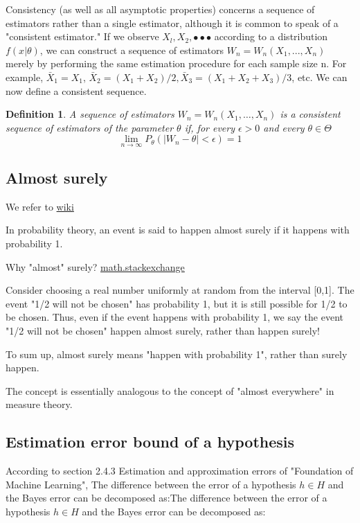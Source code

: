 \documentclass[12pt]{article}
\newtheorem{defn}[thm]{Definition}
\theoremstyle{definition}
\begin{document}
Consistency (as well as all asymptotic properties) concerns a sequence of estimators rather than a single estimator, although it is common to speak of a "consistent estimator." If we observe $X_l, X_2 , •••$ according to a distribution $f(x|\theta)$, we can construct a sequence of estimators $W_n = W_n(X_1, ... , X_n)$ merely by performing the same estimation procedure for each sample size n. For example, $\bar{X}_{1}=X_{1}$, $\bar{X}_2 = (X_{1}+X_{2} )/2, \bar{X}_3 = (X_{1}+X_{2}+X_{3} )/3$, etc. We can now define a consistent sequence.
\begin{defn}
	A sequence of estimators $W_{n}=W_{n}\left(X_{1}, \ldots, X_{n}\right)$ is a consistent sequence of estimators of the parameter $\theta$ if, for every $\epsilon>0$ and every $\theta \in \Theta$
	\begin{equation*}
	\lim _{n \rightarrow \infty} P_{\theta}\left(\left|W_{n}-\theta\right|<\epsilon\right)=1
	\end{equation*}
\end{defn}

\subsection{Almost surely}

We refer to \href{https://en.wikipedia.org/wiki/Almost_surely}{wiki}

In probability theory, an event is said to happen almost surely if it happens with probability 1.

Why "almost" surely? \href{https://math.stackexchange.com/questions/1443015/why-do-we-say-almost-surely-in-probability-theory}{math.stackexchange}

Consider choosing a real number uniformly at random from the interval [0,1]. The event "1/2 will not be chosen" has probability 1, but it is still possible for 1/2 to be chosen. Thus, even if the event happens with probability 1, we say the event "1/2 will not be chosen" happen almost surely, rather than happen surely!

To sum up, almost surely means "happen with probability 1", rather than surely happen.

The concept is essentially analogous to the concept of "almost everywhere" in measure theory.


\subsection{Estimation error bound of a hypothesis}
According to section 2.4.3 Estimation and approximation errors of "Foundation of Machine Learning", The diﬀerence between the error of a hypothesis $h\in H$ and the Bayes error can be decomposed as:The diﬀerence between the error of a hypothesis $h\in H$ and the Bayes error can be decomposed as:
\end{document}
